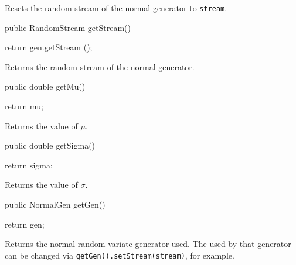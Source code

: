 \begin{tabb}
Resets the random stream of the normal generator to \texttt{stream}.
\end{tabb}
\begin{code}

   public RandomStream getStream() \begin{hide} { return gen.getStream (); }\end{hide}
\end{code}
\begin{tabb}
Returns the random stream of the normal generator.
\end{tabb}
\begin{code}

   public double getMu() \begin{hide} { return mu; }\end{hide}
\end{code}
\begin{tabb}
Returns the value of $\mu$.
\end{tabb}
\begin{code}

   public double getSigma() \begin{hide} { return sigma; }\end{hide}
\end{code}
\begin{tabb}
Returns the value of $\sigma$.
\end{tabb}
\begin{code}

   public NormalGen getGen() \begin{hide} { return gen; }\end{hide}
\end{code}
\begin{tabb}
Returns the normal random variate generator used.
The 
used by that generator can be changed via
\texttt{getGen().setStream(stream)}, for example.
\end{tabb}
\begin{code} \begin{hide}

    // This is called by setObservationTimes to precompute constants
    // in order to speed up the path generation.
   protected void init() {
        super.init();
        mudt       = new double[d];
        sigmasqrdt = new double[d];
        for (int j = 0; j < d; j++) {
            double dt     = t[j+1] - t[j];
            mudt[j]       = mu * dt;
            sigmasqrdt[j] = sigma * Math.sqrt (dt);
        }
     }

} \end{hide}
\end{code}
